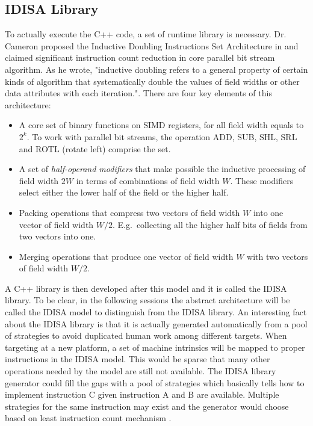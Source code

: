 \subsection{IDISA Library}
To actually execute the C++ code, a set of runtime library is necessary. Dr. Cameron proposed the Inductive Doubling Instructions Set Architecture in \cite{inductive_doubling_principle} and claimed significant instruction count reduction in core parallel bit stream algorithm. As he wrote, "inductive doubling refers to a general property of certain kinds of algorithm that systematically double the values of field widths or other data attributes with each iteration."\cite{inductive_doubling_principle}. There are four key elements of this architecture:
\begin{itemize}
    \item A core set of binary functions on SIMD registers, for all field width equals to $2^k$. To work with parallel bit streams, the operation ADD, SUB, SHL, SRL and ROTL (rotate left) comprise the set.
    \item A set of \textit{half-operand modifiers} that make possible the inductive processing of field width $2W$ in terms of combinations of field width $W$. These modifiers select either the lower half of the field or the higher half.
    \item Packing operations that compress two vectors of field width $W$ into one vector of field width $W/2$. E.g.\ collecting all the higher half bits of fields from two vectors into one.
    \item Merging operations that produce one vector of field width $W$ with two vectors of field width $W/2$.
\end{itemize}

A C++ library is then developed after this model and it is called the IDISA library. To be clear, in the following sessions the abstract architecture will be called the IDISA model to distinguish from the IDISA library. An interesting fact about the IDISA library is that it is actually generated automatically from a pool of strategies to avoid duplicated human work among different targets. When targeting at a new platform, a set of machine intrinsics will be mapped to proper instructions in the IDISA model. This would be sparse that many other operations needed by the model are still not available. The IDISA library generator could fill the gaps with a pool of strategies which basically tells how to implement instruction C given instruction A and B are available. Multiple strategies for the same instruction may exist and the generator would choose based on least instruction count mechanism \cite{hua_idisa}.

